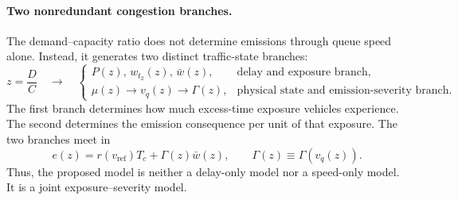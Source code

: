 %



\paragraph{Two nonredundant congestion branches.}
The demand--capacity ratio does not determine emissions through queue speed
alone. Instead, it generates two distinct traffic-state branches:
\begin{equation}
\label{eq:two_branch_state}
z=\frac{D}{C}
\quad\longrightarrow\quad
\begin{cases}
P(z),\,w_{t_2}(z),\,\bar w(z),
& \text{delay and exposure branch},\\[1mm]
\mu(z)\longrightarrow v_q(z)\longrightarrow\Gamma(z),
& \text{physical state and emission-severity branch}.
\end{cases}
\end{equation}
The first branch determines how much excess-time exposure vehicles experience.
The second determines the emission consequence per unit of that exposure.
The two branches meet in
\begin{equation}
\label{eq:two_branch_emission_summary}
e(z)
=
r(v_{\mathrm{ref}})T_c
+
\Gamma(z)\bar w(z),
\qquad
\Gamma(z)
\equiv
\Gamma\!\left(v_q(z)\right).
\end{equation}
Thus, the proposed model is neither a delay-only model nor a speed-only model.
It is a joint exposure--severity model.



